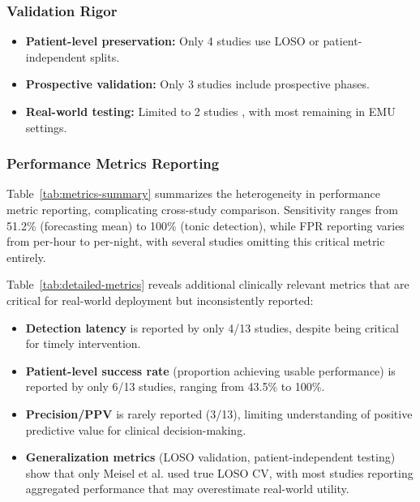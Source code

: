 \subsubsection{Validation Rigor}
\begin{itemize}
  \item \textbf{Patient-level preservation:} Only 4 studies use LOSO or patient-independent splits.
  \item \textbf{Prospective validation:} Only 3 studies \parencite{spahrDeepLearningbasedDetection2025,dongTwoLayerEnsembleMethod2022,elemamAutomatedValidatedTool2025} include prospective phases.
  \item \textbf{Real-world testing:} Limited to 2 studies \parencite{vielufSeizureMonitoringCombined2025,nasseriAmbulatorySeizureForecasting2021}, with most remaining in EMU settings.
\end{itemize}

\subsubsection{Performance Metrics Reporting}
Table~\ref{tab:metrics-summary} summarizes the heterogeneity in performance metric reporting, complicating cross-study comparison. Sensitivity ranges from 51.2\% (forecasting mean) to 100\% (tonic detection), while FPR reporting varies from per-hour to per-night, with several studies omitting this critical metric entirely.

Table~\ref{tab:detailed-metrics} reveals additional clinically relevant metrics that are critical for real-world deployment but inconsistently reported:
\begin{itemize}
  \item \textbf{Detection latency} is reported by only 4/13 studies, despite being critical for timely intervention.
  \item \textbf{Patient-level success rate} (proportion achieving usable performance) is reported by only 6/13 studies, ranging from 43.5\% to 100\%.
  \item \textbf{Precision/PPV} is rarely reported (3/13), limiting understanding of positive predictive value for clinical decision-making.
  \item \textbf{Generalization metrics} (LOSO validation, patient-independent testing) show that only Meisel et al. used true LOSO CV, with most studies reporting aggregated performance that may overestimate real-world utility.
\end{itemize}

